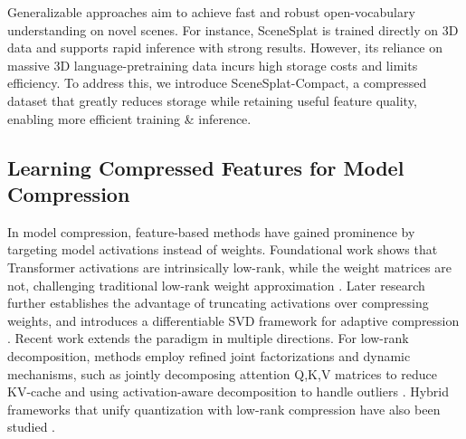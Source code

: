 \documentclass[10pt,twocolumn,letterpaper]{article}
\begin{document}
Generalizable approaches aim to achieve fast and robust open-vocabulary understanding on novel scenes. For instance, SceneSplat \cite{li2025scenesplat} is trained directly on 3D data and supports rapid inference with strong results. However, its reliance on massive 3D language-pretraining data incurs high storage costs and limits efficiency. To address this, we introduce SceneSplat-Compact, a compressed dataset that greatly reduces storage while retaining useful feature quality, enabling more efficient training \& inference.
\subsection{Learning Compressed Features for Model Compression}
In model compression, feature-based methods have gained prominence by targeting model activations instead of weights. Foundational work shows that Transformer activations are intrinsically low-rank, while the weight matrices are not, challenging traditional low-rank weight approximation \cite{yu2023compressing}. Later research further establishes the advantage of truncating activations over compressing weights, and introduces a differentiable SVD framework for adaptive compression \cite{wang2025dobi}.
Recent work extends the paradigm in multiple directions. For low-rank decomposition, methods employ refined joint factorizations and dynamic mechanisms, such as jointly decomposing attention Q,K,V matrices to reduce KV-cache \cite{wang2025qsvd} and using activation-aware decomposition to handle outliers \cite{tsitsikas2020nsvd}. Hybrid frameworks that unify quantization with low-rank compression have also been studied \cite{chiang2025uniql,mikaelyan2025deltallm}.
\end{document}
